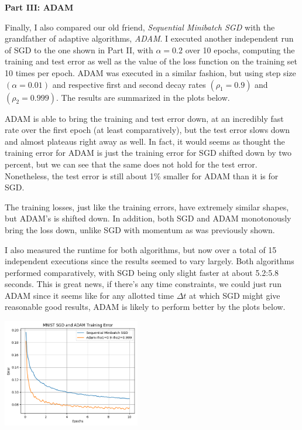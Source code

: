 \documentclass[10pt]{article}
\begin{document}
\begin{multicols}{2}
\begin{center}
\end{center}
\noindent
\textbf{Part III: ADAM} \par
Finally, I also compared our old friend, \textit{Sequential Minibatch SGD} with the grandfather of adaptive algorithms, \textit{ADAM}. I executed another independent run of SGD to the one shown in Part II, with $\alpha = 0.2$ over 10 epochs, computing the training and test error as well as the value of the loss function on the training set 10 times per epoch. ADAM was executed in a similar fashion, but using step size $(\alpha=0.01)$ and respective first and second decay rates $(\rho_1 = 0.9)$ and $(\rho_2 = 0.999)$. The results are summarized in the plots below.\par 
ADAM is able to bring the training and test error down, at an incredibly fast rate over the first epoch (at least comparatively), but the test error slows down and almost plateaus right away as well. In fact, it would seems as thought the training error for ADAM is just the training error for SGD shifted down by two percent, but we can see that the same does not hold for the test error. Nonetheless, the test error is still about 1\% smaller for ADAM than it is for SGD. \par
The training losses, just like the training errors, have extremely similar shapes, but ADAM's is shifted down. In addition, both SGD and ADAM monotonously bring the loss down, unlike SGD with momentum as was previously shown. \par 
I also measured the runtime for both algorithms, but now over a total of 15 independent executions since the results seemed to vary largely. Both algorithms performed comparatively, with SGD being only slight faster at about 5.2:5.8 seconds. This is great news, if there's any time constraints, we could just run ADAM since it seems like for any allotted time $\Delta t$ at which SGD might give reasonable good results, ADAM is likely to perform better by the plots below.\par
\begin{center}
    \includegraphics[width=0.45\textwidth]{SGDandADAMTrainingError.png}

\end{center}
\end{multicols}
\end{document}
